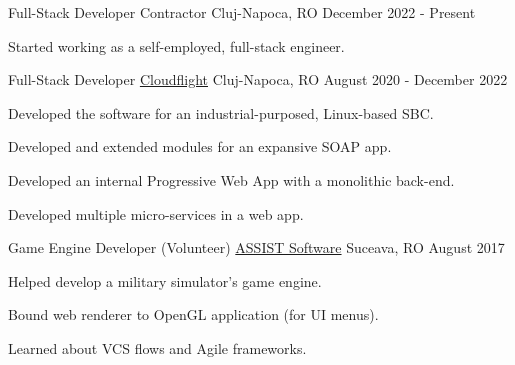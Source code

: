 

\begin{cventries}

  \cventry
  {Full-Stack Developer}
  {Contractor}
  {Cluj-Napoca, RO}
  {December 2022 - Present}
  {
    \begin{cvitems}
      \item {Started working as a self-employed, full-stack engineer.}
    \end{cvitems}
  }

  \cventry
  {Full-Stack Developer}
  {\href{https://cloudflight.io}{Cloudflight}}
  {Cluj-Napoca, RO}
  {August 2020 - December 2022}
  {
    \begin{cvitems}
      \item {Developed the software for an industrial-purposed, Linux-based SBC.}
      \item {Developed and extended modules for an expansive SOAP app.}
      \item {Developed an internal Progressive Web App with a monolithic back-end.}
      \item {Developed multiple micro-services in a web app.}
    \end{cvitems}
  }

  \cventry
  {Game Engine Developer (Volunteer)}
  {\href{https://assist-software.net/}{ASSIST Software}}
  {Suceava, RO}
  {August 2017}
  {
    \begin{cvitems}
      \item {Helped develop a military simulator's game engine.}
      \item {Bound web renderer to OpenGL application (for UI menus).}
      \item {Learned about VCS flows and Agile frameworks.}
    \end{cvitems}
  }

\end{cventries}